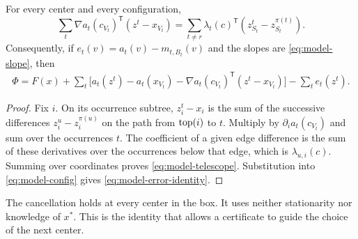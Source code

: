 \begin{lemma}\label{lem:model-telescope}
For every center and every configuration,
\begin{equation}\label{eq:model-telescope}
 \sum_t\nabla a_t(c_{V_t})^{\mathsf T}(z^t-x_{V_t})
 =\sum_{t\ne r}\lambda_t(c)^{\mathsf T}
       (z^t_{S_t}-z^{\pi(t)}_{S_t}).
\end{equation}
Consequently, if $e_t(v)=a_t(v)-m_{t,B_t}(v)$ and the slopes are
\eqref{eq:model-slope}, then
\begin{align}\label{eq:model-error-identity}
 \Phi=F(x)+\sum_t\bigl[
 a_t(z^t)-a_t(x_{V_t})
 -\nabla a_t(c_{V_t})^{\mathsf T}(z^t-x_{V_t})\bigr]
 -\sum_t e_t(z^t).
\end{align}
\end{lemma}
\begin{proof}
Fix $i$. On its occurrence subtree, $z_i^t-x_i$ is the sum of the
successive differences $z_i^u-z_i^{\pi(u)}$ on the path from
$\operatorname{top}(i)$ to $t$. Multiply by $\partial_i a_t(c_{V_t})$ and sum over
the occurrences $t$. The coefficient of a given edge difference is the
sum of these derivatives over the occurrences below that edge, which
is $\lambda_{u,i}(c)$. Summing over coordinates proves
\eqref{eq:model-telescope}. Substitution into \eqref{eq:model-config}
gives \eqref{eq:model-error-identity}.
\end{proof}

The cancellation holds at every center in the box. It uses neither
stationarity nor knowledge of $x^*$. This is the identity that allows a
certificate to guide the choice of the next center.
